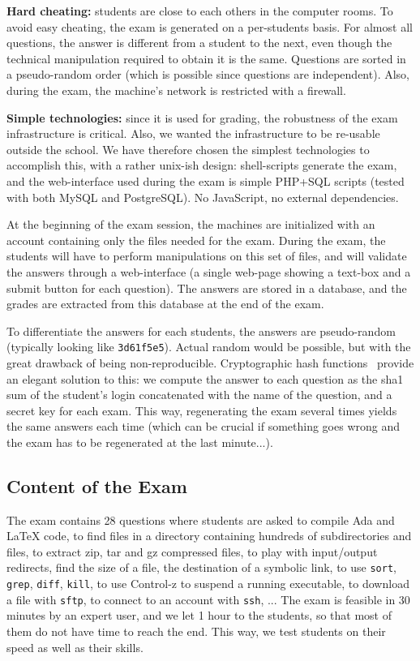 \documentclass{sig-alternate}
\begin{document}
\textbf{Hard cheating:} students are close to each others in the
  computer rooms. To avoid easy cheating, the exam is generated on a
  per-students basis. For almost all questions, the answer is
  different from a student to the next, even though the technical
  manipulation required to obtain it is the same. Questions are sorted
  in a pseudo-random order (which is possible since questions are
  independent). Also, during the exam, the machine's network is
  restricted with a firewall.

\textbf{Simple technologies:} since it is used for grading, the
  robustness of the exam infrastructure is critical. Also, we wanted
  the infrastructure to be re-usable outside the school. We have
  therefore chosen the simplest technologies to accomplish this, with
  a rather unix-ish design: shell-scripts generate the exam, and the
  web-interface used during the exam is simple PHP+SQL scripts (tested
  with both MySQL and PostgreSQL). No JavaScript, no external
  dependencies.

At the beginning of the exam session, the machines are initialized
with an account containing only the files needed for the exam. During
the exam, the students will have to perform manipulations on this set
of files, and will validate the answers through a web-interface (a
single web-page showing a text-box and a submit button for each
question). The answers are stored in a database, and the grades are
extracted from this database at the end of the exam.

\label{sha1sum}
To differentiate the answers for each students, the answers are
pseudo-random (typically looking like \texttt{3d61f5e5}). Actual
random would be possible, but with the great drawback of being
non-reproducible. Cryptographic hash functions~\cite{hash-functions}
provide an
elegant solution to this: we compute the answer to each question as
the sha1 sum of the student's login concatenated with the name of the
question, and a secret key for each exam. This way, regenerating the
exam several times yields the same answers each time (which can be
crucial if something goes wrong and the exam has to be regenerated at
the last minute...).

\subsection{Content of the Exam}

The exam contains 28 questions where students are asked to compile Ada
and \LaTeX{} code, to find files in a directory containing hundreds of
subdirectories and files, to extract zip, tar and gz compressed
files, to play with input/output redirects, find the size of a file,
the destination of a symbolic link, to use \texttt{sort},
\texttt{grep}, \texttt{diff}, \texttt{kill}, to use Control-z to
suspend a running executable, to download a file with \texttt{sftp},
to connect to an account with \texttt{ssh}, ... The exam is feasible
in 30 minutes by an expert user, and we let 1 hour to the students, so
that most of them do not have time to reach the end. This way, we test
students on their speed as well as their skills.
\end{document}

